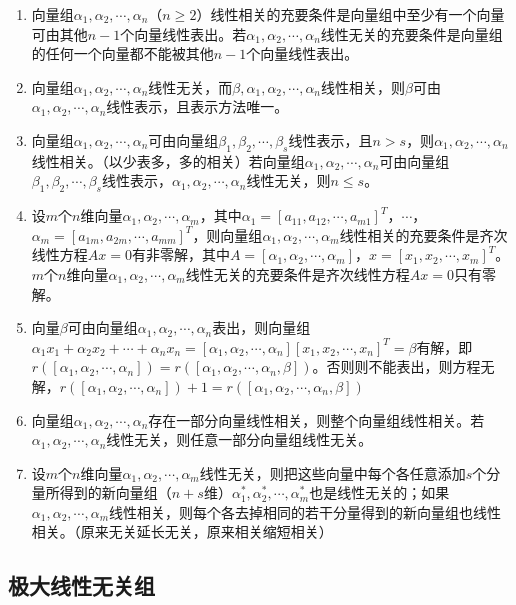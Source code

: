 \begin{enumerate}
    \item 向量组$\alpha_1,\alpha_2,\cdots,\alpha_n$（$n\geqslant2$）线性相关的充要条件是向量组中至少有一个向量可由其他$n-1$个向量线性表出。若$\alpha_1,\alpha_2,\cdots,\alpha_n$线性无关的充要条件是向量组的任何一个向量都不能被其他$n-1$个向量线性表出。
    \item 向量组$\alpha_1,\alpha_2,\cdots,\alpha_n$线性无关，而$\beta,\alpha_1,\alpha_2,\cdots,\alpha_n$线性相关，则$\beta$可由$\alpha_1,\alpha_2,\cdots,\alpha_n$线性表示，且表示方法唯一。
    \item 向量组$\alpha_1,\alpha_2,\cdots,\alpha_n$可由向量组$\beta_1,\beta_2,\cdots,\beta_s$线性表示，且$n>s$，则$\alpha_1,\alpha_2,\cdots,\alpha_n$线性相关。（以少表多，多的相关）若向量组$\alpha_1,\alpha_2,\cdots,\alpha_n$可由向量组$\beta_1,\beta_2,\cdots,\beta_s$线性表示，$\alpha_1,\alpha_2,\cdots,\alpha_n$线性无关，则$n\leqslant s$。
    \item 设$m$个$n$维向量$\alpha_1,\alpha_2,\cdots,\alpha_m$，其中$\alpha_1=[a_{11},a_{12},\cdots,a_{m1}]^T$，$\cdots$，$\alpha_m=[a_{1m},a_{2m},\cdots,a_{mm}]^T$，则向量组$\alpha_1,\alpha_2,\cdots,\alpha_m$线性相关的充要条件是齐次线性方程$Ax=0$有非零解，其中$A=[\alpha_1,\alpha_2,\cdots,\alpha_m]$，$x=[x_1,x_2,\cdots,x_m]^T$。$m$个$n$维向量$\alpha_1,\alpha_2,\cdots,\alpha_m$线性无关的充要条件是齐次线性方程$Ax=0$只有零解。
    \item 向量$\beta$可由向量组$\alpha_1,\alpha_2,\cdots,\alpha_n$表出，则向量组$\alpha_1x_1+\alpha_2x_2+\cdots+\alpha_nx_n=[\alpha_1,\alpha_2,\cdots,\alpha_n][x_1,x_2,\cdots,x_n]^T=\beta$有解，即$r([\alpha_1,\alpha_2,\cdots,\alpha_n])=r([\alpha_1,\alpha_2,\cdots,\alpha_n,\beta])$。否则则不能表出，则方程无解，$r([\alpha_1,\alpha_2,\cdots,\alpha_n])+1=r([\alpha_1,\alpha_2,\cdots,\alpha_n,\beta])$
    \item 向量组$\alpha_1,\alpha_2,\cdots,\alpha_n$存在一部分向量线性相关，则整个向量组线性相关。若$\alpha_1,\alpha_2,\cdots,\alpha_n$线性无关，则任意一部分向量组线性无关。
    \item 设$m$个$n$维向量$\alpha_1,\alpha_2,\cdots,\alpha_m$线性无关，则把这些向量中每个各任意添加$s$个分量所得到的新向量组（$n+s$维）$\alpha_1^*,\alpha_2^*,\cdots,\alpha_m^*$也是线性无关的；如果$\alpha_1,\alpha_2,\cdots,\alpha_m$线性相关，则每个各去掉相同的若干分量得到的新向量组也线性相关。（原来无关延长无关，原来相关缩短相关）
\end{enumerate}

\subsection{极大线性无关组}

